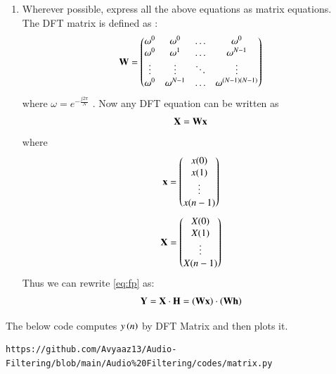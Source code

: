 \documentclass[journal,12pt,twocolumn]{IEEEtran}
\theoremstyle{remark}
\renewcommand\thesection{\arabic{section}}
\numberwithin{equation}{subsection}
\begin{document}
\begin{enumerate}[label=\thesection.\arabic*]
\item Wherever possible, express all the above equations as matrix equations.\\
\solution The DFT matrix is defined as : 
\begin{align}
	\mathbf{W} = 
	\begin{pmatrix}
		\omega^0 & \omega^0 & \ldots & \omega^0 \\
		\omega^0 & \omega^1 & \ldots & \omega^{N - 1} \\
		\vdots & \vdots & \ddots & \vdots \\
		\omega^0 & \omega^{N - 1} & \ldots & \omega^{(N -1)(N - 1)}
	\end{pmatrix}
\end{align}
where $\omega=e^{-\frac{j2\pi}{N}}$ . Now any DFT equation can be written as
\begin{align}
    \mathbf{X} = \mathbf{W}\mathbf{x}
\end{align}
\noindent where
\begin{align}
	\mathbf{x} = 
	\begin{pmatrix}
		x(0) \\ x(1) \\ \vdots \\ x(n - 1)
	\end{pmatrix}
\end{align}
\begin{align}
	\mathbf{X} = 
	\begin{pmatrix}
		X(0) \\ X(1) \\ \vdots \\ X(n - 1)
	\end{pmatrix}
\end{align}
Thus we can rewrite  \eqref{eq:fp} as:
\begin{align}
	\mathbf{Y} = \mathbf{X}\cdot\mathbf{H} = \left(\mathbf{W}\mathbf{x}\right)\cdot\left(\mathbf{W}\mathbf{h}\right)
\end{align}
\end{enumerate}
The below code computes $y\left(n\right)$ by DFT Matrix and then plots it.
\begin{lstlisting}
https://github.com/Avyaaz13/Audio-Filtering/blob/main/Audio%20Filtering/codes/matrix.py
\end{lstlisting}
\end{document}
